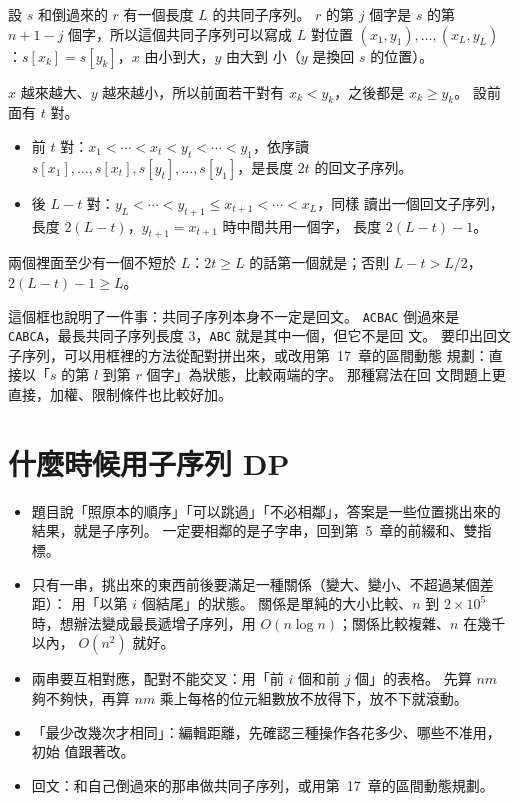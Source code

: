 \begin{whybox}
設 $s$ 和倒過來的 $r$ 有一個長度 $L$ 的共同子序列。 $r$ 的第 $j$ 個字是 $s$
的第 $n + 1 - j$ 個字，所以這個共同子序列可以寫成 $L$ 對位置
$(x_1, y_1), \ldots, (x_L, y_L)$：$s[x_k] = s[y_k]$，$x$ 由小到大，$y$ 由大到
小（$y$ 是換回 $s$ 的位置）。

$x$ 越來越大、$y$ 越來越小，所以前面若干對有 $x_k < y_k$，之後都是
$x_k \ge y_k$。 設前面有 $t$ 對。
\begin{itemize}
\item 前 $t$ 對：$x_1 < \cdots < x_t < y_t < \cdots < y_1$，依序讀
$s[x_1], \ldots, s[x_t], s[y_t], \ldots, s[y_1]$，是長度 $2t$ 的回文子序列。
\item 後 $L - t$ 對：$y_L < \cdots < y_{t+1} \le x_{t+1} < \cdots < x_L$，同樣
讀出一個回文子序列，長度 $2(L - t)$，$y_{t+1} = x_{t+1}$ 時中間共用一個字，
長度 $2(L - t) - 1$。
\end{itemize}
兩個裡面至少有一個不短於 $L$：$2t \ge L$ 的話第一個就是；否則 $L - t > L / 2$，
$2(L - t) - 1 \ge L$。
\end{whybox}

這個框也說明了一件事：共同子序列本身不一定是回文。 \texttt{ACBAC} 倒過來是
\texttt{CABCA}，最長共同子序列長度 $3$，\texttt{ABC} 就是其中一個，但它不是回
文。 要印出回文子序列，可以用框裡的方法從配對拼出來，或改用第~17~章的區間動態
規劃：直接以「$s$ 的第 $l$ 到第 $r$ 個字」為狀態，比較兩端的字。 那種寫法在回
文問題上更直接，加權、限制條件也比較好加。

\section{什麼時候用子序列 DP}
\label{sec:ss-when}

\begin{itemize}
\item 題目說「照原本的順序」「可以跳過」「不必相鄰」，答案是一些位置挑出來的
結果，就是子序列。 一定要相鄰的是子字串，回到第~5~章的前綴和、雙指標。
\item 只有一串，挑出來的東西前後要滿足一種關係（變大、變小、不超過某個差距）：
用「以第 $i$ 個結尾」的狀態。 關係是單純的大小比較、$n$ 到 $2 \times 10^5$
時，想辦法變成最長遞增子序列，用 $O(n \log n)$；關係比較複雜、$n$ 在幾千以內，
$O(n^2)$ 就好。
\item 兩串要互相對應，配對不能交叉：用「前 $i$ 個和前 $j$ 個」的表格。 先算
$nm$ 夠不夠快，再算 $nm$ 乘上每格的位元組數放不放得下，放不下就滾動。
\item 「最少改幾次才相同」：編輯距離，先確認三種操作各花多少、哪些不准用，初始
值跟著改。
\item 回文：和自己倒過來的那串做共同子序列，或用第~17~章的區間動態規劃。
\end{itemize}

